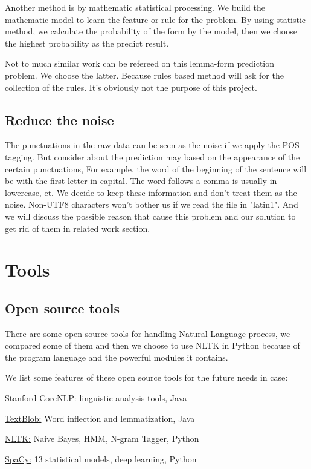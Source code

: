 \documentclass[a4paper]{article}
\begin{document}
Another method is by mathematic statistical processing. We build the mathematic model to learn the feature or rule for the problem. By using statistic method, we calculate the probability of the form by the model, then we choose the highest probability as the predict result. 

Not to much similar work can be refereed on this lemma-form prediction problem. We choose the latter. Because rules based method will ask for the collection of the rules. It's obviously not the purpose of this project.

\subsection{Reduce the noise}
The punctuations in the raw data can be seen as the noise 
if we apply the POS tagging. But consider about the prediction may based on the appearance of the certain punctuations, For example, the word of the beginning of the sentence will be with the first letter in capital. The word follows a comma is usually in lowercase, et. We decide to keep these information and don't treat them as the noise.
Non-UTF8 characters won't bother us if we read the file in "latin1". And we will discuss the possible reason that cause this problem and our solution to get rid of them in related work section.


\section{Tools}
\subsection{Open source tools}
There are some open source tools for handling Natural Language process, we compared some of them and then we choose to use NLTK in Python because of the program language and the powerful modules it contains. 

We list some features of these open source tools for the future needs in case:

\href{https://stanfordnlp.github.io/CoreNLP/}{Stanford CoreNLP:} linguistic analysis tools, Java

\href{http://textblob.readthedocs.io/en/dev/}{TextBlob:} Word inflection and lemmatization, Java

\href{https://www.nltk.org/}{NLTK:} Naive Bayes, HMM, N-gram Tagger, Python

\href{https://spacy.io/}{SpaCy:} 13 statistical models, deep learning, Python
\end{document}
